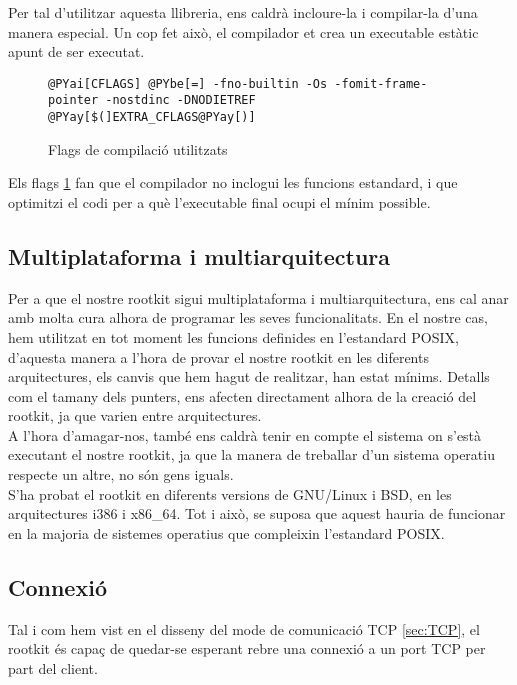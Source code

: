 Per tal d'utilitzar aquesta llibreria, ens caldrà incloure-la i compilar-la d'una manera especial. Un cop fet això, el compilador et crea un executable estàtic apunt de ser executat.
\begin{figure}[htp]
\begin{Verbatim}[commandchars=@\[\]]
@PYai[CFLAGS] @PYbe[=] -fno-builtin -Os -fomit-frame-pointer -nostdinc -DNODIETREF  @PYay[$(]EXTRA_CFLAGS@PYay[)] 
\end{Verbatim}
\caption{Flags de compilació utilitzats}
\label{fig:cflags}
\end{figure}

Els flags \ref{fig:cflags} fan que el compilador no inclogui les funcions estandard, i que optimitzi el codi 
per a què l'executable final ocupi el mínim possible.

\subsection{Multiplataforma i multiarquitectura}

Per a que el nostre rootkit sigui multiplataforma i multiarquitectura, ens cal anar amb molta cura alhora de programar les 
seves funcionalitats. En el nostre cas, hem utilitzat en tot moment les funcions definides en l'estandard POSIX, d'aquesta manera a l'hora de provar el nostre rootkit en les diferents arquitectures, els canvis que hem hagut de realitzar, han estat mínims. Detalls com el tamany dels punters, ens afecten directament alhora de la creació
del rootkit, ja que varien entre arquitectures. \\

A l'hora d'amagar-nos, també ens caldrà tenir en compte el sistema on s'està executant el nostre rootkit, ja que la manera de treballar
d'un sistema operatiu respecte un altre, no són gens iguals. \\

S'ha probat el rootkit en diferents versions de GNU/Linux i BSD, en les arquitectures i386 i x86\_64. Tot
i això, se suposa que aquest hauria de funcionar en la majoria de sistemes operatius que compleixin 
l'estandard POSIX.


\subsection{Connexió}

Tal i com hem vist en el disseny del mode de comunicació TCP \ref{sec:TCP}, el rootkit és capaç de quedar-se 
esperant rebre una connexió a un port TCP per part del client. \\

